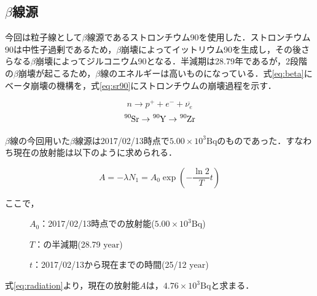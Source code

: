 \subsection*{$\beta$線源}
今回は粒子線として$\beta$線源であるストロンチウム90を使用した．ストロンチウム90は中性子過剰であるため，$\beta$崩壊によってイットリウム90を生成し，その後さらなる$\beta$崩壊によってジルコニウム90となる．半減期は28.79年であるが，2段階の$\beta$崩壊が起こるため，$\beta$線のエネルギーは高いものになっている．式\ref{eq:beta}にベータ崩壊の機構を，式\ref{eq:sr90}にストロンチウムの崩壊過程を示す．\par
\begin{equation}
  \label{eq:beta}
  n \rightarrow p^{+} + e^{-} + \overline{\nu_e}
\end{equation}
\begin{equation}
  \label{eq:sr90}
  \ce{^{90}Sr} \rightarrow \ce{^{90}Y} \rightarrow \ce{^{90}Zr}
\end{equation}


$\beta$線の今回用いた$\beta$線源は2017/02/13時点で$ 5.00 \times 10^3 \mathrm{Bq}$のものであった．すなわち現在の放射能は以下のように求められる．

\begin{equation}
\label{eq:radiation}
  A = -\lambda N_1 = A_0 \exp \left( - \frac{\ln 2}{T} t \right)
\end{equation}

ここで，
\begin{description}
\item[] $A_0$：2017/02/13時点での放射能($ 5.00 \times 10^3 \mathrm{Bq}$)
\item[] $T$：の半減期(28.79 $\mathrm{year}$)
\item[] $t$：2017/02/13から現在までの時間(25/12 $\mathrm{year}$)
\end{description}

式\ref{eq:radiation}より，現在の放射能$A$は，$4.76 \times 10^3 \mathrm{Bq}$と求まる．
  




